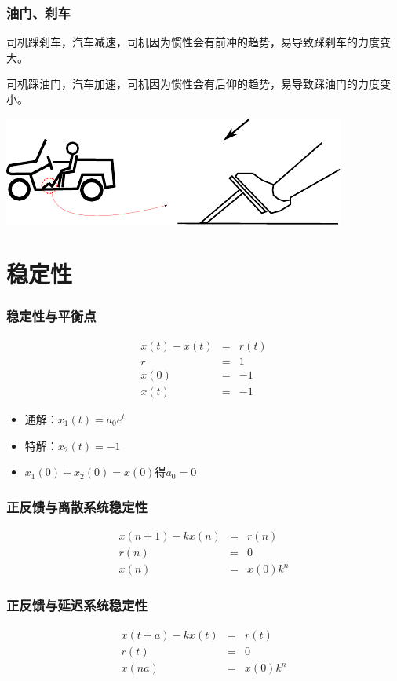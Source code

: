 \documentclass{beamer}
\begin{document}
\begin{frame}
\frametitle{油门、刹车}
\label{sec-1-4}


司机踩刹车，汽车减速，司机因为惯性会有前冲的趋势，易导致踩刹车的力度变大。

司机踩油门，汽车加速，司机因为惯性会有后仰的趋势，易导致踩油门的力度变小。

\includegraphics[width=\textwidth]{image/drive.pdf}
\end{frame}
\section{稳定性}
\label{sec-2}
\begin{frame}
\frametitle{稳定性与平衡点}
\label{sec-2-1}


\begin{eqnarray*}
\dot x(t)-x(t) & = & r(t)\\
r &=& 1 \\
x(0) &=& -1 \\
x(t) &=& -1
\end{eqnarray*}

\begin{itemize}
\item 通解：$x_1(t)=a_0e^t$
\item 特解：$x_2(t)=-1$
\item $x_1(0)+x_2(0)=x(0)$得$a_0=0$
\end{itemize}
\end{frame}
\begin{frame}
\frametitle{正反馈与离散系统稳定性}
\label{sec-2-2}

\begin{eqnarray*}
x(n+1)-kx(n) &=& r(n) \\
r(n) & = & 0 \\
x(n) &=& x(0)k^n
\end{eqnarray*}
\end{frame}
\begin{frame}
\frametitle{正反馈与延迟系统稳定性}
\label{sec-2-3}

\begin{eqnarray*}
x(t+a)-kx(t) &=& r(t) \\
r(t) &=& 0 \\
x(na) &=& x(0)k^{n}
\end{eqnarray*}
\end{frame}
\end{document}
